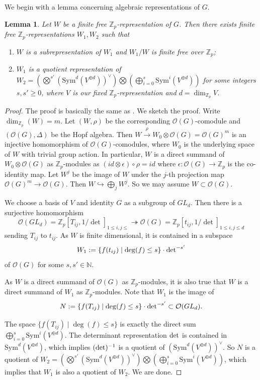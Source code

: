 \documentclass[10pt]{article}
\newtheorem{lem}[thm]{Lemma}
\numberwithin{equation}{section}
\newcommand{\bN}{{\mathbb N}}
\newcommand{\bZ}{{\mathbb Z}}
\newcommand{\calO}{{\mathcal O}}
\newcommand{\Sym}{{\mathrm{Sym}}}           %
\begin{document}
We begin with a lemma concerning algebraic representations of $G$.


\begin{lem}\label{Lem-rep}
  Let $W$ be a finite free $\bZ_p$-representation of $G$. Then there exists finite free $\bZ_p$-representations $W_1,W_2$ such that 
  \begin{enumerate}
      \item $W$ is a subrepresentation of $W_1$ and $W_1/W$ is finite free over $\bZ_p$;
      \item  $W_1$ is a quotient representation of $W_2=(\bigotimes^{s'}(\Sym^d(V^{\oplus d}))^{\vee})\bigotimes (\bigoplus_{i=0}^s\Sym^i(V^{\oplus d}))$ for some integers $s,s'\geq 0$, where $V$ is our fixed $\bZ_p$-representation and $d=\dim_{\bZ_p}V$.
      
  \end{enumerate}
\end{lem}
\begin{proof}
    The proof is basically the same as \cite[Theorem 4.12]{milne2017algebraic}.  We sketch the proof.
Write $\dim_{\bZ_p}(W)=m$. Let $(W,\rho)$ be the corresponding $\calO(G)$-comodule and $(\calO(G),\Delta)$ be the Hopf algebra. Then 
    $W\xrightarrow{
    \rho} W_0\otimes\calO(G)=\calO(G)^m$ is an injective homomorphism of $\calO(G)$-comodules, where $W_0$ is the underlying space of $W$ with trivial group action. In particular, $W$ is a direct summand of $W_0\otimes\calO(G)$ as $\bZ_p$-modules as $(id\otimes \epsilon)\circ\rho=id$ where $\epsilon: \calO(G)\to \bZ_p$ is the co-identity map. Let $W^j$ be the image of $W$ under the $j$-th projection map $\calO(G)^m\to \calO(G)$. Then $W\hookrightarrow \bigoplus_jW^j$. So we may assume $W\subset \calO(G)$.

    We choose a basis of $V$ and identity $G$ as a subgroup of $GL_d$. Then there is a surjective homomorphism
    \[
    \calO(GL_d)=\bZ_p[T_{ij},1/{\det}]_{1\leq i,j\leq }\twoheadrightarrow \calO(G)=\bZ_p[t_{ij},1/\det]_{1\leq i,j\leq d}
    \]
    sending $T_{ij}$ to $t_{ij}$. As $W$ is finite dimensional, it is contained in a subspace 
    \[
  W_1:= \{f(t_{ij})\mid \deg(f)\leq s\}\cdot {\rm det}^{-s'}
    \]
    of $\calO(G)$ for some $s,s'\in \bN$. 

   As $W$ is a direct summand of $\calO(G)$ as $\bZ_p$-modules, it is also true that $W$ is a direct summand of $W_1$ as $\bZ_p$-modules.  Note that $W_1$ is the image of 
   \[N:= \{f(T_{ij})\mid \deg(f)\leq s\}\cdot {\rm det}^{-s'}\subset \calO(GL_d).\]

   The space $\{f(T_{ij})\mid \deg(f)\leq s\}$ is exactly the direct sum $\bigoplus_{i=0}^s\Sym^i(V^{\oplus d})$. The determinant representation $\rm det$ is contained in $\Sym^d(V^{\oplus d})$, which implies $(\rm det)^{-1}$ is a quotient of $(\Sym^d(V^{\oplus d}))^{\vee}$. So $N$ is a quotient of $W_2=(\bigotimes^{s'}(\Sym^d(V^{\oplus d}))^{\vee})\bigotimes (\bigoplus_{i=0}^s\Sym^i(V^{\oplus d}))$, which implies that $W_1$ is also a quotient of $W_2$. We are done.

\end{proof}
\end{document}
